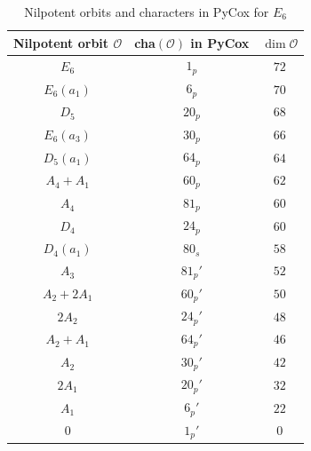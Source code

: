 \documentclass[reqno,12pt]{amsart}
\numberwithin{equation}{section}
\theoremstyle{plain}
\theoremstyle{definition}
\begin{document}
\begin{table}[htbp]\caption{Nilpotent orbits and characters in PyCox  for $ E_6$ }
\label{tabchare6-0}
\centering
\renewcommand{\arraystretch}{1.3}
\setlength\tabcolsep{5pt}
{ \begin{tabular}{|c|c|c|}
\hline Nilpotent orbit $\mathcal{O}$ & cha$(\mathcal{O})$ in PyCox & $\dim \mathcal{O}$ \\ \hline
$E_6$& $1_p$& $72$\\\hline
$E_{6}(a_1)$& $6_p$& $70$\\\hline
$D_5$& $20_p$& $68$\\\hline
$E_{6}(a_3)$& $30_p$& $66$\\\hline
$D_{5}(a_1)$& $64_p$& $64$\\\hline

$A_4+A_1$& $60_p$& $62$\\\hline
$A_4$& $81_p$& $60$\\
$D_4$& $24_p$& $60$\\\hline
$D_4(a_1)$& $80_s$& $58$\\\hline
$A_3$& $81_p'$& $52$\\\hline
$A_2+2A_1$& $60_p'$& $50$\\\hline
$2A_2$& $24_p'$& $48$\\\hline
$A_2+A_1$& $64_p'$& $46$\\\hline
$A_2$& $30_p'$& $42$\\\hline
$2A_1$& $20_p'$& $32$\\\hline
$A_1$& $6_p'$& $22$\\\hline
$0$& $1_p'$& $0$\\\hline

\end{tabular}}
\bigskip

\end{table}
\end{document}
